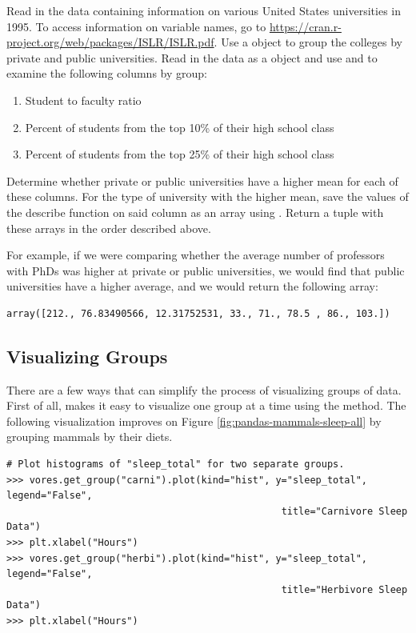 \begin{problem}
Read in the data  containing information on various United States universities in 1995.
To access information on variable names, go to \url{https://cran.r-project.org/web/packages/ISLR/ISLR.pdf}.
Use a  object to group the colleges by private and public universities.
Read in the data as a  object and use  and  to examine the following columns by group:
\begin{enumerate}
\item Student to faculty ratio
\item Percent of students from the top 10\% of their high school class
\item Percent of students from the top 25\% of their high school class
\end{enumerate}
Determine whether private or public universities have a higher mean for each of these columns.
For the type of university with the higher mean, save the values of the describe function on said column as an array using .
Return a tuple with these arrays in the order described above.

For example, if we were comparing whether the average number of professors with PhDs was higher at private or public universities, we would find that public universities have a higher average, and we would return the following array:

\begin{lstlisting}
array([212., 76.83490566, 12.31752531, 33., 71., 78.5 , 86., 103.])
\end{lstlisting}




\end{problem}

\subsection*{Visualizing Groups} %

There are a few ways that  can simplify the process of visualizing groups of data.
First of all,  makes it easy to visualize one group at a time using the  method.
The following visualization improves on Figure \ref{fig:pandas-mammals-sleep-all} by grouping mammals by their diets.

\begin{lstlisting}
# Plot histograms of "sleep_total" for two separate groups.
>>> vores.get_group("carni").plot(kind="hist", y="sleep_total", legend="False",
                                                title="Carnivore Sleep Data")
>>> plt.xlabel("Hours")
>>> vores.get_group("herbi").plot(kind="hist", y="sleep_total", legend="False",
                                                title="Herbivore Sleep Data")
>>> plt.xlabel("Hours")
\end{lstlisting}

